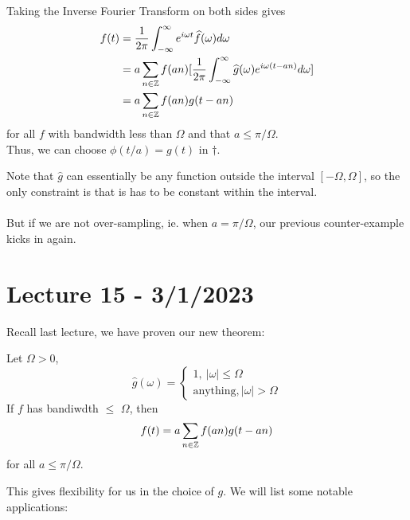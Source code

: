\documentclass{article}
\begin{document}
Taking the Inverse Fourier Transform on both sides gives
\begin{align*}
    f(t) &= \frac{1}{2\pi} \int_{-\infty}^\infty e^{i\omega t} \widehat{f}(\omega) d\omega \\
    &= a \sum_{n \in \mathbb{Z}} f(an) [\frac{1}{2\pi} \int_{-\infty}^\infty \widehat{g}(\omega) e^{i \omega (t - an)} d\omega]\\
    &= a \sum_{n \in \mathbb{Z}} f(an) g(t - an)
\end{align*}
for all $f$ with bandwidth less than $\Omega$ and that $a \leq \pi/\Omega$.\\

Thus, we can choose $\phi(t/a) = g(t)$ in $\dagger$.

\begin{remark}
    Note that $\widehat{g}$ can essentially be any function outside the interval $[-\Omega, \Omega]$, so the only constraint is that is has to be constant within the interval.\\\\
    But if we are not over-sampling, ie. when $a = \pi/\Omega$, our previous counter-example kicks in again.
\end{remark}

\newpage
\section{Lecture 15 - 3/1/2023}

Recall last lecture, we have proven our new theorem:
\begin{theorem}
    Let $\Omega > 0$, 
    \[
    \widehat{g}(\omega) = \begin{cases}
        1,\ |\omega| \leq \Omega\\
        \text{anything}, |\omega| > \Omega
    \end{cases}
    \]
    If $f$ has bandiwdth $\leq$ $\Omega$, then
    \[f(t) = a \sum_{n \in \mathbb{Z}} f(an) g(t - an)\]
    for all $a \leq \pi/\Omega$.
\end{theorem}

This gives flexibility for us in the choice of $g$. We will list some notable applications:
\end{document}
